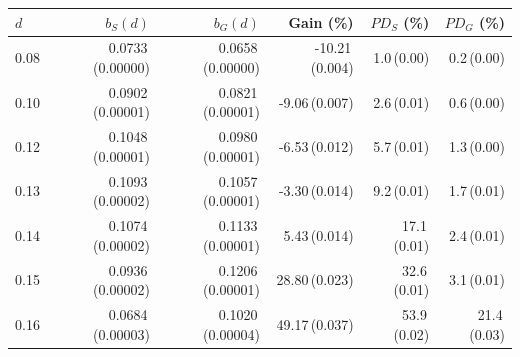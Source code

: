 \begin{tabular}{@{}lrrrrr@{}}
\toprule
$d$ & $b_S(d)$ & $b_G(d)$ & Gain (\%) & $PD_S$ (\%) & $PD_G$ (\%) \\ \midrule
0.08 & 0.0733\,(0.00000) & 0.0658\,(0.00000) & -10.21\,(0.004) & 1.0\,(0.00) & 0.2\,(0.00) \\
0.10 & 0.0902\,(0.00001) & 0.0821\,(0.00001) & -9.06\,(0.007) & 2.6\,(0.01) & 0.6\,(0.00) \\
0.12 & 0.1048\,(0.00001) & 0.0980\,(0.00001) & -6.53\,(0.012) & 5.7\,(0.01) & 1.3\,(0.00) \\
0.13 & 0.1093\,(0.00002) & 0.1057\,(0.00001) & -3.30\,(0.014) & 9.2\,(0.01) & 1.7\,(0.01) \\
0.14 & 0.1074\,(0.00002) & 0.1133\,(0.00001) & 5.43\,(0.014) & 17.1\,(0.01) & 2.4\,(0.01) \\
0.15 & 0.0936\,(0.00002) & 0.1206\,(0.00001) & 28.80\,(0.023) & 32.6\,(0.01) & 3.1\,(0.01) \\
0.16 & 0.0684\,(0.00003) & 0.1020\,(0.00004) & 49.17\,(0.037) & 53.9\,(0.02) & 21.4\,(0.03) \\
\bottomrule
\end{tabular}
